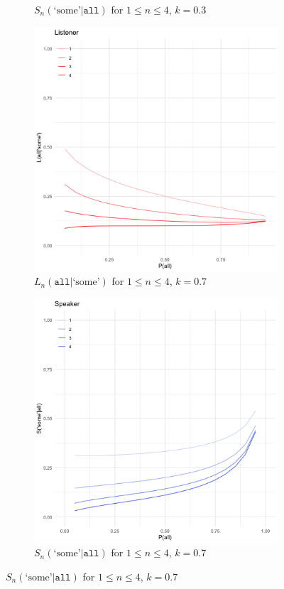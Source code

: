 \documentclass[12pt, a4paper, usenames, dvipsnames]{article}
\begin{document}
\begin{figure}[!htb]
\begin{subfigure}{.48\linewidth}
    \caption{\(S_n(\text{`some'}|\texttt{all})\) for \(1\leq n\leq 4\), $k=0.3$}
  \end{subfigure}
  \begin{subfigure}{.48\linewidth} 
    \includegraphics[width=\textwidth]{graphs/shannonRSA-L07.png}
    \caption{\(L_n(\texttt{all}|\text{`some'})\) for \(1\leq n\leq 4\), $k=0.7$}
  \end{subfigure}
  \begin{subfigure}{.48\linewidth} 
    \includegraphics[width=\textwidth]{graphs/shannonRSA-S07.png}
    \caption{\(S_n(\text{`some'}|\texttt{all})\) for \(1\leq n\leq 4\), $k=0.7$}
  \end{subfigure}
\end{figure}



\end{document}
